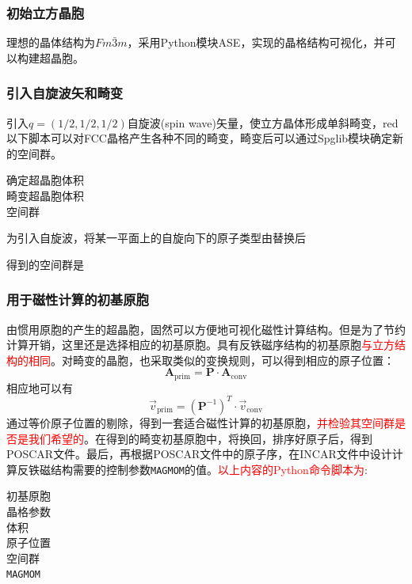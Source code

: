 \subsubsection{初始立方晶胞}
理想的晶体结构为$Fm\bar{3}m$，采用\textrm{Python}模块\textrm{ASE}，实现的晶格结构可视化，并可以构建超晶胞。

\subsubsection{引入自旋波矢和畸变}
引入$q=(1/2,1/2,1/2)$自旋波\textrm{(spin wave)}矢量，使立方晶体形成单斜畸变，\textrm{red}{以下脚本可以对\textrm{FCC}晶格产生各种不同的畸变}，畸变后可以通过\textrm{Spglib}模块确定新的空间群。

确定超晶胞体积\\
畸变超晶胞体积\\
空间群

为引入自旋波，将某一平面上的自旋向下的原子类型由替换后

得到的空间群是

\subsubsection{用于磁性计算的初基原胞}
由惯用原胞的产生的超晶胞，固然可以方便地可视化磁性计算结构。但是为了节约计算开销，这里还是选择相应的初基原胞。具有反铁磁序结构的初基原胞\textcolor{red}{与立方结构的相同}。对畸变的晶胞，也采取类似的变换规则，可以得到相应的原子位置：
\begin{displaymath}
	\mathbf{A}_{\mathrm{prim}}=\mathbf{P}\cdot\mathbf{A}_{\mathrm{conv}}
\end{displaymath}
相应地可以有
\begin{displaymath}
	\vec v_{\mathrm{prim}}=(\mathbf{P}^{-1})^{T}\cdot\vec v_{\mathrm{conv}}
\end{displaymath}
通过等价原子位置的剔除，得到一套适合磁性计算的初基原胞，\textcolor{red}{并检验其空间群是否是我们希望的}。在得到的畸变初基原胞中，将换回，排序好原子后，得到\textrm{POSCAR}文件。最后，再根据\textrm{POSCAR}文件中的原子序，在\textrm{INCAR}文件中设计计算反铁磁结构需要的控制参数\texttt{MAGMOM}的值。\textcolor{red}{以上内容的\textrm{Python}命令脚本为}:

初基原胞\\
晶格参数\\
体积\\
原子位置\\
空间群\\
\texttt{MAGMOM}

